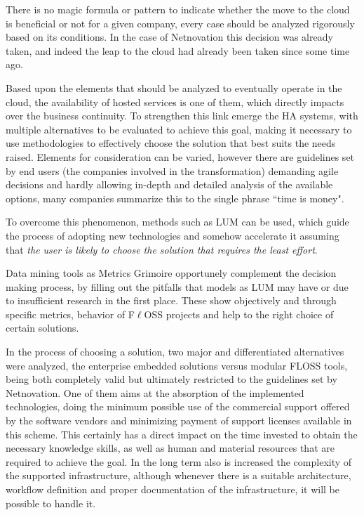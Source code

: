 \documentclass[a4paper, 12pt]{book}
\begin{document}
\noindent There is no magic formula or pattern to indicate whether the move to the cloud is beneficial or not for a given company, every case should be analyzed rigorously based on its conditions. In the case of Netnovation this decision was already taken, and indeed the leap to the cloud had already been taken since some time ago.\bigskip

\noindent Based upon the elements that should be analyzed to eventually operate in the cloud, the availability of hosted services is one of them, which directly impacts over the business continuity. To strengthen this link emerge the HA systems, with multiple alternatives to be evaluated to achieve this goal, making it necessary to use methodologies to effectively choose the solution that best suits the needs raised. Elements for consideration can be varied, however there are guidelines set by end users (the companies involved in the transformation) demanding agile decisions and hardly allowing in-depth and detailed analysis of the available options, many companies summarize this to the single phrase ``time is money".\bigskip

\noindent To overcome this phenomenon, methods such as LUM can be used, which guide the process of adopting new technologies and somehow accelerate it assuming that \textit{the user is likely to choose the solution that requires the least effort}.\bigskip

\noindent Data mining tools as Metrics Grimoire opportunely complement the decision making process, by filling out the pitfalls that models as LUM may have or due to insufficient research in the first place. These show objectively and through specific metrics, behavior of F$\ell$OSS projects and help to the right choice of certain solutions.\bigskip

\noindent In the process of choosing a solution, two major and differentiated alternatives were analyzed, the enterprise embedded solutions versus modular FLOSS tools, being both completely valid but ultimately restricted to the guidelines set by Netnovation. One of them aims at the absorption of the implemented technologies, doing the minimum possible use of the commercial support offered by the software vendors and minimizing payment of support licenses available in this scheme. This certainly has a direct impact on the time invested to obtain the necessary knowledge skills, as well as human and material resources that are required to achieve the goal. In the long term also is increased the complexity of the supported infrastructure, although whenever there is a suitable architecture, workflow definition and proper documentation of the infrastructure, it will be possible to handle it.\bigskip
\end{document}
